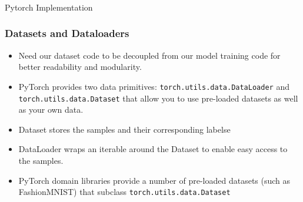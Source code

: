 





\begin{frame}[fragile]\frametitle{}

\begin{center}
{\Large Pytorch Implementation}
\end{center}
\end{frame}

\begin{frame}[fragile]
\frametitle{Datasets and Dataloaders}

\begin{itemize}
\item Need our dataset code to be decoupled from our model training code for better readability and modularity. 
\item PyTorch provides two data primitives: \lstinline|torch.utils.data.DataLoader| and \lstinline|torch.utils.data.Dataset| that allow you to use pre-loaded datasets as well as your own data. 
\item Dataset stores the samples and their corresponding labelse
\item  DataLoader wraps an iterable around the Dataset to enable easy access to the samples.
\item PyTorch domain libraries provide a number of pre-loaded datasets (such as FashionMNIST) that subclass \lstinline|torch.utils.data.Dataset|
\end{itemize}

\end{frame} 

